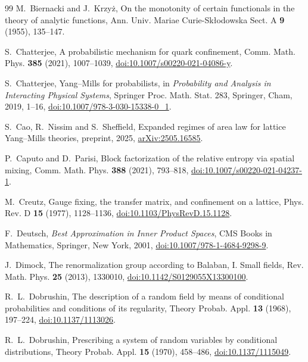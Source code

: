 \begin{thebibliography}{99}
M.~Biernacki and J.~Krzy\.z, On the monotonity of certain functionals in the theory of analytic functions, Ann. Univ. Mariae Curie-Sk{\l}odowska Sect. A \textbf{9} (1955), 135--147.

S.~Chatterjee, A probabilistic mechanism for quark confinement, Comm. Math. Phys. \textbf{385} (2021), 1007--1039, \href{https://doi.org/10.1007/s00220-021-04086-y}{doi:10.1007/s00220-021-04086-y}.

S.~Chatterjee, Yang--Mills for probabilists, in \emph{Probability and Analysis in Interacting Physical Systems}, Springer Proc. Math. Stat. 283, Springer, Cham, 2019, 1--16, \href{https://doi.org/10.1007/978-3-030-15338-0_1}{doi:10.1007/978-3-030-15338-0\_1}.

S.~Cao, R.~Nissim and S.~Sheffield, Expanded regimes of area law for lattice Yang--Mills theories, preprint, 2025, \href{https://arxiv.org/abs/2505.16585}{arXiv:2505.16585}.

P.~Caputo and D.~Parisi, Block factorization of the relative entropy via spatial mixing, Comm. Math. Phys. \textbf{388} (2021), 793--818, \href{https://doi.org/10.1007/s00220-021-04237-1}{doi:10.1007/s00220-021-04237-1}.

M.~Creutz, Gauge fixing, the transfer matrix, and confinement on a lattice,
Phys. Rev. D \textbf{15} (1977), 1128--1136,
\href{https://doi.org/10.1103/PhysRevD.15.1128}{doi:10.1103/PhysRevD.15.1128}.

F.~Deutsch, \emph{Best Approximation in Inner Product Spaces}, CMS Books in Mathematics, Springer, New York, 2001, \href{https://doi.org/10.1007/978-1-4684-9298-9}{doi:10.1007/978-1-4684-9298-9}.

J.~Dimock, The renormalization group according to Balaban, I. Small fields, Rev. Math. Phys. \textbf{25} (2013), 1330010, \href{https://doi.org/10.1142/S0129055X13300100}{doi:10.1142/S0129055X13300100}.

R.~L.~Dobrushin, The description of a random field by means of conditional
probabilities and conditions of its regularity, Theory Probab. Appl.
\textbf{13} (1968), 197--224,
\href{https://doi.org/10.1137/1113026}{doi:10.1137/1113026}.

R.~L.~Dobrushin, Prescribing a system of random variables by conditional
distributions, Theory Probab. Appl. \textbf{15} (1970), 458--486,
\href{https://doi.org/10.1137/1115049}{doi:10.1137/1115049}.


\end{thebibliography}
